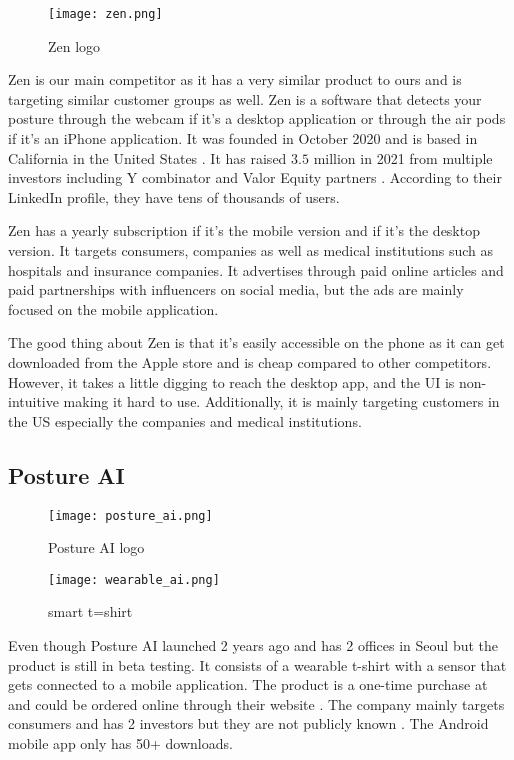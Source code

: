 \documentclass{article}
\begin{document}
\begin{figure}[h!]
    \centering
    \texttt{[image: zen.png]}
    \caption{Zen logo}
    \label{fig:enter-label}
\end{figure}

Zen is our main competitor as it has a very similar product to ours and is targeting similar customer groups as well. Zen is a software that detects your posture through the webcam if it’s a desktop application or through the air pods if it’s an iPhone application.  It was founded in October 2020 and is based in California in the United States \cite{zen_crunchbase}. It has raised $3.5$ million in 2021 from multiple investors including Y combinator\cite{posturehealth_ycombinator} and Valor Equity partners \cite{zen_techcrunch}. According to their LinkedIn\cite{posturehealth_linkedin} profile, they have tens of thousands of users. 

Zen has a  yearly subscription if it’s the mobile version and  if it’s the desktop version. It targets consumers, companies as well as medical institutions such as hospitals and insurance companies. It advertises through paid online articles and paid partnerships with influencers on social media, but the ads are mainly focused on the mobile application.

The good thing about Zen is that it’s easily accessible on the phone as it can get downloaded from the Apple store and is cheap compared to other competitors. However, it takes a little digging to reach the desktop app, and the UI is non-intuitive making it hard to use. Additionally, it is mainly targeting customers in the US especially the companies and medical institutions.

\subsection*{Posture AI}
\begin{figure}[h!]
    \centering
    \texttt{[image: posture\_ai.png]}
    \caption{Posture AI logo}
    \label{fig:enter-label}
\end{figure}

\begin{figure}[h!]
    \centering
    \texttt{[image: wearable\_ai.png]}
    \caption{smart t=shirt}
    \label{fig:enter-label}
\end{figure}
Even though Posture AI launched 2 years ago and has 2 offices in Seoul \cite{postureai_linkedin} but the product is still in beta testing. It consists of a wearable t-shirt with a sensor that gets connected to a mobile application. The product is a one-time purchase at  and could be ordered online through their website \cite{myposture}. The company mainly targets consumers and has 2 investors but they are not publicly known \cite{postureai_pitchbook}. The Android mobile app only has 50+ downloads. 
\end{document}
